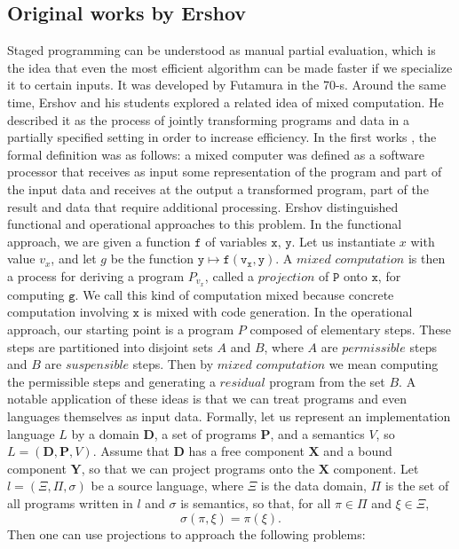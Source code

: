 \documentclass[11pt]{article}
\theoremstyle{definition}
\newcommand{\code}[1]{\texttt{#1}}
\newcommand\tab[1][1cm]{\hspace*{#1}}
\begin{document}
\subsection{Original works by Ershov}
\tab Staged programming can be understood as manual partial evaluation, which is the idea that even the most efficient algorithm can be made faster if we specialize it to certain inputs. It was developed by Futamura \cite{futamura1983partial} in the 70-s. Around the same time, Ershov \cite{ershov1982mixed} and his students explored a related idea of mixed computation. He described it as the process of jointly transforming programs and data in a partially specified setting in order to increase efficiency. \newline 
\tab In the first works \cite{ershov1982mixed}, the formal definition was as follows: a mixed computer was defined as a software processor that receives as input some representation of the program and part of the input data and receives at the output a transformed program, part of the result and data that require additional processing. Ershov distinguished functional and operational approaches to this problem. In the functional approach, we are given a function $\code{f}$ of variables $\code{x, y}$. Let us instantiate $x$ with value $v_x$, and let $g$ be the function $\mathtt{y \mapsto f(v_x, y)}$. A $\textit{mixed computation}$ is then a process for deriving a program $P_{v_x}$, called a $\textit{projection}$ of $\code{P}$ onto $\code{x}$, for computing $\code{g}$. We call this kind of computation mixed because concrete computation involving $\code{x}$ is mixed with code generation. In the operational approach, our starting point is a program $P$ composed of elementary steps. These steps are partitioned into disjoint sets $A$ and $B$, where $A$ are $\textit{permissible}$ steps and $B$ are $\textit{suspensible}$ steps. Then by $\textit{mixed computation}$ we mean computing the permissible steps and generating a $\textit{residual}$ program from the set $B$. \newline 
\tab A notable application of these ideas is that we can treat programs and even languages themselves as input data. Formally, let us represent an implementation language $L$ by a domain $\textbf{D}$, a set of programs  $\textbf{P}$, and a semantics $V$, so $L = (\textbf{D}, \textbf{P}, V)$. Assume that $\textbf{D}$ has a free component $\textbf{X}$ and a bound component $\textbf{Y}$, so that we can project programs onto the $\textbf{X}$ component. Let $l = (\Xi, \Pi, \sigma)$ be a source language, where $\Xi$ is the data domain, $\Pi$ is the set of all programs written in $l$ and $\sigma$ is semantics, so that, for all $\pi \in \Pi$ and $\xi \in \Xi$, $$ \sigma(\pi, \xi) = \pi(\xi).$$ Then one can use projections to approach the following problems:
\end{document}
